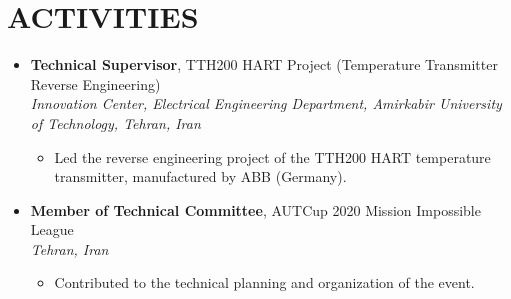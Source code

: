 \documentclass[11pt,a4paper,sans]{moderncv} %
\begin{document}






\section{ACTIVITIES}

\begin{itemize}
    \item \textbf{Technical Supervisor}, TTH200 HART Project (Temperature Transmitter Reverse Engineering) \\
    \textit{Innovation Center, Electrical Engineering Department, Amirkabir University of Technology, Tehran, Iran}
    \begin{itemize}
        \item Led the reverse engineering project of the TTH200 HART temperature transmitter, manufactured by ABB (Germany).
    \end{itemize}
    
    \item \textbf{Member of Technical Committee}, AUTCup 2020 Mission Impossible League \\
    \textit{Tehran, Iran}
    \begin{itemize}
        \item Contributed to the technical planning and organization of the event.
    \end{itemize}
\end{itemize}
\end{document}
